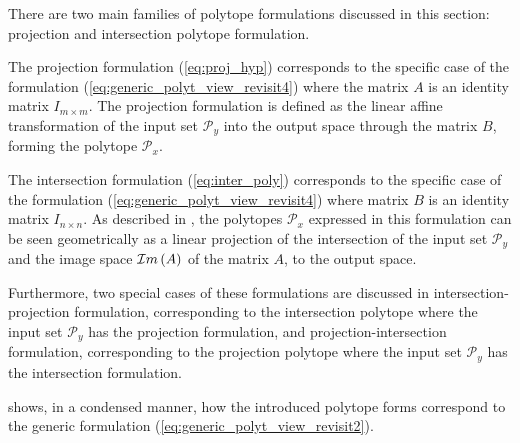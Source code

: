 There are two main families of polytope formulations discussed in this section: projection and intersection polytope formulation. 

The projection formulation (\ref{eq:proj_hyp}) corresponds to the specific case of the formulation  (\ref{eq:generic_polyt_view_revisit4}) where the matrix $A$ is an identity matrix $I_{m\times m}$.
The projection formulation is defined as the linear affine transformation of the input set $\mathcal{P}_y$ into the output space through the matrix $B$, forming the polytope $\mathcal{P}_x$. 

The intersection formulation (\ref{eq:inter_poly}) corresponds to the specific case of the formulation 
(\ref{eq:generic_polyt_view_revisit4}) where matrix $B$ is an identity matrix $I_{n\times n}$. As described in , the polytopes $\mathcal{P}_x$ expressed in this formulation can be seen geometrically as a linear projection of the intersection of the input set $\mathcal{P}_y$ and the image space $\mathcal{I}m\left(A\right)$ of the matrix $A$, to the output space. 

Furthermore, two special cases of these formulations are discussed in  intersection-projection formulation, corresponding to the intersection polytope where the input set $\mathcal{P}_y$ has the projection formulation, and projection-intersection formulation, corresponding to the projection polytope where the input set $\mathcal{P}_y$ has the intersection formulation. 

 shows, in a condensed manner, how the introduced polytope forms correspond to the generic formulation (\ref{eq:generic_polyt_view_revisit2}).


